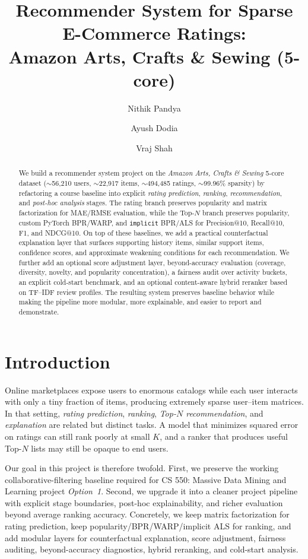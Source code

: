 \documentclass[sigconf,nonacm]{acmart}
\title{Recommender System for Sparse E-Commerce Ratings:\\
Amazon Arts, Crafts \& Sewing (5-core)}
\author{Nithik Pandya}
\affiliation{%
  \institution{Rutgers University--New Brunswick}
  \city{New Brunswick}
  \state{New Jersey}
  \country{USA}
}
\author{Ayush Dodia}
\affiliation{%
  \institution{Rutgers University--New Brunswick}
  \city{New Brunswick}
  \state{New Jersey}
  \country{USA}
}
\author{Vraj Shah}
\affiliation{%
  \institution{Rutgers University--New Brunswick}
  \city{New Brunswick}
  \state{New Jersey}
  \country{USA}
}
\newcommand{\Course}{CS 550: Massive Data Mining and Learning\xspace}
\begin{document}
\begin{abstract}
We build a recommender system project on the \emph{Amazon Arts, Crafts \& Sewing} 5-core dataset ($\sim$56{,}210 users, $\sim$22{,}917 items, $\sim$494{,}485 ratings, $\sim$99.96\% sparsity) by refactoring a course baseline into explicit \emph{rating prediction}, \emph{ranking}, \emph{recommendation}, and \emph{post-hoc analysis} stages. The rating branch preserves popularity and matrix factorization for MAE/RMSE evaluation, while the Top-$N$ branch preserves popularity, custom PyTorch BPR/WARP, and \texttt{implicit} BPR/ALS for Precision@10, Recall@10, F1, and NDCG@10. On top of these baselines, we add a practical counterfactual explanation layer that surfaces supporting history items, similar support items, confidence scores, and approximate weakening conditions for each recommendation. We further add an optional score adjustment layer, beyond-accuracy evaluation (coverage, diversity, novelty, and popularity concentration), a fairness audit over activity buckets, an explicit cold-start benchmark, and an optional content-aware hybrid reranker based on TF--IDF review profiles. The resulting system preserves baseline behavior while making the pipeline more modular, more explainable, and easier to report and demonstrate.
\end{abstract}


\maketitle

\section{Introduction}
Online marketplaces expose users to enormous catalogs while each user interacts with only a tiny fraction of items, producing extremely sparse user--item matrices. In that setting, \emph{rating prediction}, \emph{ranking}, \emph{Top-$N$ recommendation}, and \emph{explanation} are related but distinct tasks. A model that minimizes squared error on ratings can still rank poorly at small $K$, and a ranker that produces useful Top-$N$ lists may still be opaque to end users.

Our goal in this project is therefore twofold. First, we preserve the working collaborative-filtering baseline required for \Course project \emph{Option~1}. Second, we upgrade it into a cleaner project pipeline with explicit stage boundaries, post-hoc explainability, and richer evaluation beyond average ranking accuracy. Concretely, we keep matrix factorization for rating prediction, keep popularity/BPR/WARP/implicit ALS for ranking, and add modular layers for counterfactual explanation, score adjustment, fairness auditing, beyond-accuracy diagnostics, hybrid reranking, and cold-start analysis.
\end{document}
